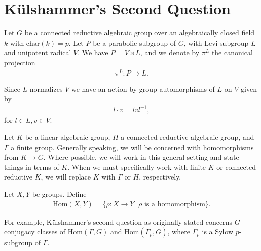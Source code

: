 
\chapter{K\"ulshammer's Second Question}
\label{Chapter4}

Let $G$ be a connected reductive algebraic group over an algebraically closed field $k$ with $\mathrm{char}(k) = p$. Let $P$ be a parabolic subgroup of $G$, with Levi subgroup $L$ and unipotent radical $V$. We have $P = V \rtimes L$, and we denote by $\pi^L$ the canonical projection
\begin{align*} \pi^L:P \rightarrow L. \end{align*}

Since $L$ normalizes $V$ we have an action by group automorphisms of $L$ on $V$ given by
\begin{align} \label{laction} l \cdot v = lvl^{-1}, \end{align}
for $l \in L, v \in V$.

Let $K$ be a linear algebraic group, $H$ a connected reductive algebraic group, and $\Gamma$ a finite group.
Generally speaking, we will be concerned with homomorphisms from $K \rightarrow G$. Where possible, we will work in this general setting and state things in terms of $K$. When we must specifically work with finite $K$ or connected reductive $K$, we will replace $K$ with $\Gamma$ or $H$, respectively.

\begin{definition} Let $X,Y$ be groups. Define
\begin{align*} \mathrm{Hom}(X, Y) = \{ \rho : X \rightarrow Y \,|\, \rho \textrm{ is a homomorphism}\}. 
\end{align*}
\end{definition}

For example, K\"ulshammer's second question as originally stated concerns $G$-conjugacy classes of $\mathrm{Hom}(\Gamma, G)$ and $\mathrm{Hom}(\Gamma_p, G)$, where $\Gamma_p$ is a Sylow $p$-subgroup of $\Gamma$.

